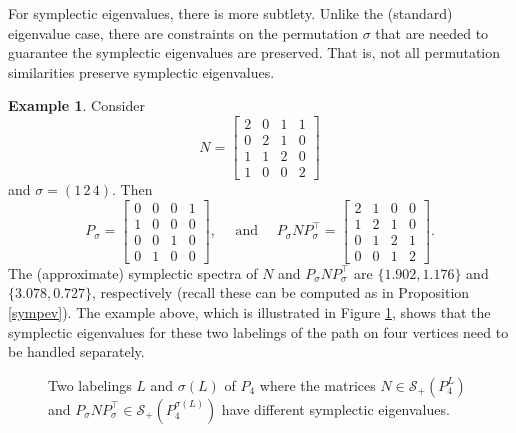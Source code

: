 \documentclass[12pt]{article}
\theoremstyle{definition}
\theoremstyle{definition}
\theoremstyle{definition}
\newtheorem{ex}[thm]{Example}
\numberwithin{figure}{section}
\numberwithin{equation}{section}
\newcommand{\symp}{\mathcal{S}_+}
\newcommand{\trans}{^{\top}}
\begin{document}
For symplectic eigenvalues, there is more subtlety.  Unlike the (standard) eigenvalue case, there are constraints on the permutation $\sigma$ that are needed to guarantee the symplectic eigenvalues are preserved. 
That is, not all permutation similarities preserve symplectic eigenvalues. 
\begin{ex}
 Consider
\[ 
N= \left[\begin{array}{rrrr}
2 & 0 & 1 & 1 \\
0 & 2 & 1 & 0 \\
1 & 1 & 2 & 0 \\
1 & 0 & 0 & 2
\end{array}\right]\] 
and $\sigma=(1\, 2\, 4)$.
Then 
\[ 
P_{\sigma} = \left[ \begin{array}{cccc}
0 & 0 & 0 & 1\\
1& 0 & 0 & 0\\
0 & 0 & 1 & 0\\
0& 1 & 0 & 0 
\end{array} 
\right] ,
\quad \mbox{ and } \quad 
 P_\sigma NP_\sigma^\top=
\left[\begin{array}{rrrr}
2 & 1 & 0 & 0 \\
1 & 2 & 1 & 0 \\
0 & 1 & 2 & 1 \\
0 & 0 & 1 & 2
\end{array}\right] .
\] 
The (approximate)  symplectic spectra  of $N$ and $ P_\sigma NP_\sigma^\top$ are  $\{ 1.902, 1.176\}$  and $\{3.078, {0.727}\}$,
respectively  (recall these can be computed as in Proposition \ref{sympev}).  
The example above, which is illustrated in Figure \ref{fig:1}, shows that the symplectic eigenvalues for these two labelings of the path on four vertices  need to be handled separately. 



\begin{figure}[H]
\begin{center}
  \caption{Two labelings $L$ and $\sigma(L)$ of $P_4$ where the matrices $N\in \symp(P_4^L)$ and $P_\sigma NP_{\sigma}\trans\in \symp(P_4^{\sigma(L)})$ have different symplectic eigenvalues. 
 \label{fig:1}}
 \end{center}
\end{figure}
\end{ex}
\end{document}
